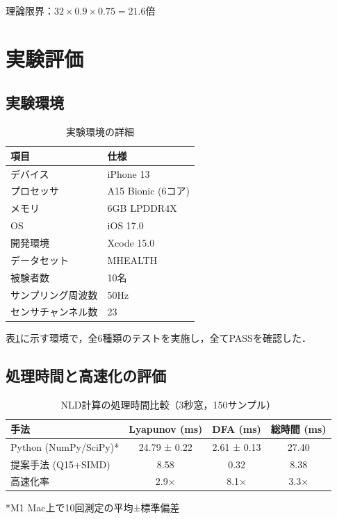 \documentclass[paper]{ieice}
\begin{document}
理論限界：$32 \times 0.9 \times 0.75 = 21.6$倍

\section{実験評価}

\subsection{実験環境}

\begin{table}[t]
\caption{実験環境の詳細}
\label{tab:environment}
\centering
\begin{tabular}{ll}
\toprule
項目 & 仕様 \\
\midrule
デバイス & iPhone 13 \\
プロセッサ & A15 Bionic (6コア) \\
メモリ & 6GB LPDDR4X \\
OS & iOS 17.0 \\
開発環境 & Xcode 15.0 \\
データセット & MHEALTH\cite{banos2014} \\
被験者数 & 10名 \\
サンプリング周波数 & 50Hz \\
センサチャンネル数 & 23 \\
\bottomrule
\end{tabular}
\end{table}

表\ref{tab:environment}に示す環境で，全6種類のテストを実施し，全てPASSを確認した．

\subsection{処理時間と高速化の評価}

\begin{table}[t]
\caption{NLD計算の処理時間比較（3秒窓，150サンプル）}
\label{tab:performance}
\centering
\begin{tabular}{lccc}
\toprule
手法 & Lyapunov (ms) & DFA (ms) & 総時間 (ms) \\
\midrule
Python (NumPy/SciPy)* & 24.79 ± 0.22 & 2.61 ± 0.13 & 27.40 \\
提案手法 (Q15+SIMD) & 8.58 & 0.32 & 8.38 \\
\midrule
高速化率 & 2.9× & 8.1× & 3.3× \\
\bottomrule
\end{tabular}
\vspace{1mm}
\footnotesize{*M1 Mac上で10回測定の平均±標準偏差}
\end{table}
\end{document}
